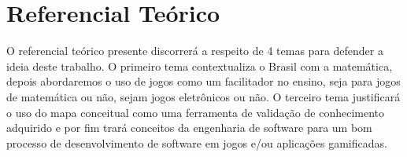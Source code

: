 \chapter[Referencial Teórico]{Referencial Teórico}
O referencial teórico presente discorrerá a respeito de 4 temas para defender a ideia deste trabalho. O primeiro tema contextualiza o Brasil com a matemática, depois abordaremos o uso de jogos como um facilitador no ensino, seja para jogos de matemática ou não, sejam jogos eletrônicos ou não. O terceiro tema justificará o uso do mapa conceitual como uma ferramenta de validação de conhecimento adquirido e por fim trará conceitos da engenharia de software para um bom processo de desenvolvimento de software em jogos e/ou aplicações gamificadas. 









\begin{comment}
Existem estudos com referencial teórico apoiando o uso de gamificação em vários contextos e utilizando dos benefícios oferecidos por ela. Exemplo de contextos como marketing, saúde, educação e etc. A gamificação é também utilizada em contextos de ensino de matemática (embora não sejam muitos os resultados encontrados para universidades). Em alguns casos são utilizados a tecnologia junto da gamificação nos contextos acima citado. É dito que a tecnologia e jogos contribuem para ajudar no engajamento e chamar atenção das pessoas e dos estudantes.
Tem um estudo dizendo que não há limites para a idade de jogar, brincar e se divertir. Por isso jogo e gamificação podem ser possíveis estratégias para utilizar em comunhão de tecnologias visando o ensino de EDO 1ª ordem para estudantes do ensino superior.
 
 \end{comment}
